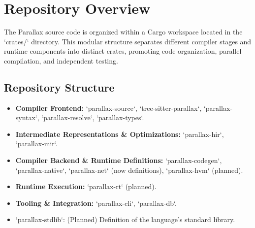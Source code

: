 \section{Repository Overview} %
The Parallax source code is organized within a Cargo workspace located in the `crates/` directory. This modular structure separates different compiler stages and runtime components into distinct crates, promoting code organization, parallel compilation, and independent testing.

\subsection{Repository Structure} %
\begin{itemize}
    \item \textbf{Compiler Frontend:} `parallax-source`, `tree-sitter-parallax`, `parallax-syntax`, `parallax-resolve`, `parallax-types`.
    \item \textbf{Intermediate Representations \& Optimizations:} `parallax-hir`, `parallax-mir`.
    \item \textbf{Compiler Backend \& Runtime Definitions:} `parallax-codegen`, `parallax-native`, `parallax-net` (now definitions), `parallax-hvm` (planned).
    \item \textbf{Runtime Execution:} `parallax-rt` (planned).
    \item \textbf{Tooling \& Integration:} `parallax-cli`, `parallax-db`.
    \item `parallax-stdlib`: (Planned) Definition of the language's standard library.
\end{itemize}

